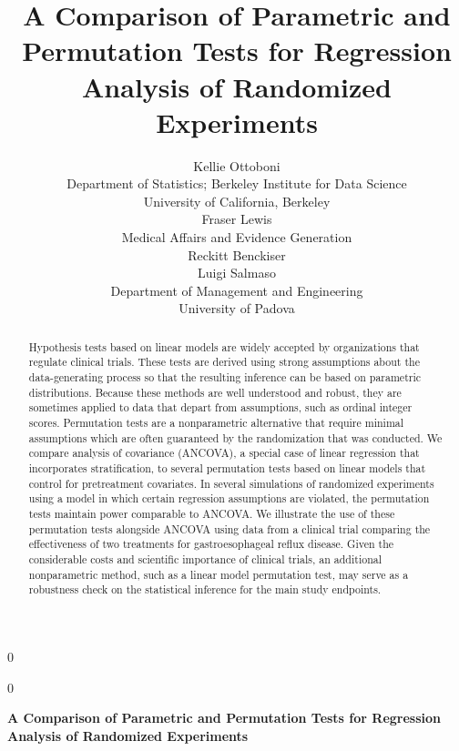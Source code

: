 \documentclass[12pt]{article}
\newcommand{\blind}{0}
\begin{document}
%

\def\spacingset#1{\renewcommand{\baselinestretch}%
{#1}\small\normalsize} \spacingset{1}



\blind
{
  \title{\bf A Comparison of Parametric and Permutation Tests for Regression Analysis of Randomized Experiments}
\author{Kellie Ottoboni \\
Department of Statistics; Berkeley Institute for Data Science\\
University of California, Berkeley \\ [.1in]
Fraser Lewis \\
Medical Affairs and Evidence Generation \\
Reckitt Benckiser\\  [.1in]
Luigi Salmaso\\
Department of Management and Engineering \\
University of Padova
}  \maketitle
} \fi

\blind
{
  \bigskip
  \bigskip
  \bigskip
  \begin{center}
    {\LARGE\bf  A Comparison of Parametric and Permutation Tests for Regression Analysis of Randomized Experiments}
\end{center}
  \medskip
} \fi

\bigskip
\begin{abstract}
Hypothesis tests based on linear models are widely accepted by organizations that regulate clinical trials.
These tests are derived using strong assumptions about the data-generating process so that the resulting inference can be based on parametric distributions.
Because these methods are well understood and robust, they are sometimes applied to data that depart from assumptions, such as ordinal integer scores.
Permutation tests are a nonparametric alternative that require minimal assumptions which are often guaranteed by the randomization that was conducted.
We compare analysis of covariance (ANCOVA), a special case of linear regression that incorporates stratification, to several permutation tests based on linear models that control for pretreatment covariates.
In several simulations of randomized experiments using a model in which certain regression assumptions are violated,
the permutation tests maintain power comparable to ANCOVA.
We illustrate the use of these permutation tests alongside ANCOVA using data from a clinical trial comparing the effectiveness of two treatments for gastroesophageal reflux disease.
Given the considerable costs and scientific importance of clinical trials, an additional nonparametric method, such as a linear model permutation test, may serve as a robustness check on the statistical inference for the main study endpoints.
\end{abstract}
\end{document}
